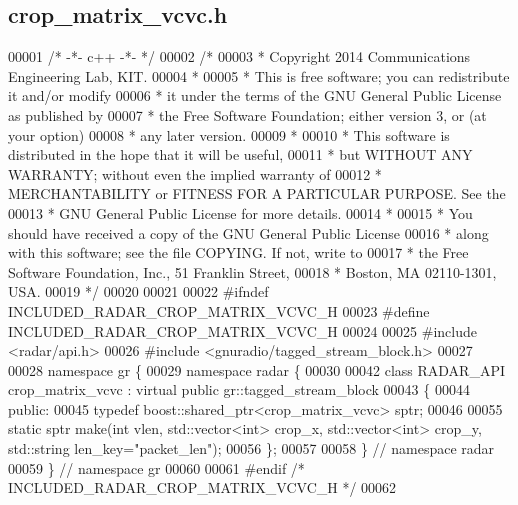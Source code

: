 \subsection{crop\+\_\+matrix\+\_\+vcvc.\+h}
\label{crop__matrix__vcvc_8h_source}

\begin{DoxyCode}
00001 \textcolor{comment}{/* -*- c++ -*- */}
00002 \textcolor{comment}{/* }
00003 \textcolor{comment}{ * Copyright 2014 Communications Engineering Lab, KIT.}
00004 \textcolor{comment}{ * }
00005 \textcolor{comment}{ * This is free software; you can redistribute it and/or modify}
00006 \textcolor{comment}{ * it under the terms of the GNU General Public License as published by}
00007 \textcolor{comment}{ * the Free Software Foundation; either version 3, or (at your option)}
00008 \textcolor{comment}{ * any later version.}
00009 \textcolor{comment}{ * }
00010 \textcolor{comment}{ * This software is distributed in the hope that it will be useful,}
00011 \textcolor{comment}{ * but WITHOUT ANY WARRANTY; without even the implied warranty of}
00012 \textcolor{comment}{ * MERCHANTABILITY or FITNESS FOR A PARTICULAR PURPOSE.  See the}
00013 \textcolor{comment}{ * GNU General Public License for more details.}
00014 \textcolor{comment}{ * }
00015 \textcolor{comment}{ * You should have received a copy of the GNU General Public License}
00016 \textcolor{comment}{ * along with this software; see the file COPYING.  If not, write to}
00017 \textcolor{comment}{ * the Free Software Foundation, Inc., 51 Franklin Street,}
00018 \textcolor{comment}{ * Boston, MA 02110-1301, USA.}
00019 \textcolor{comment}{ */}
00020 
00021 
00022 \textcolor{preprocessor}{#ifndef INCLUDED\_RADAR\_CROP\_MATRIX\_VCVC\_H}
00023 \textcolor{preprocessor}{#define INCLUDED\_RADAR\_CROP\_MATRIX\_VCVC\_H}
00024 
00025 \textcolor{preprocessor}{#include <radar/api.h>}
00026 \textcolor{preprocessor}{#include <gnuradio/tagged\_stream\_block.h>}
00027 
00028 \textcolor{keyword}{namespace }gr \{
00029   \textcolor{keyword}{namespace }radar \{
00030 
00042     \textcolor{keyword}{class }RADAR_API crop_matrix_vcvc : \textcolor{keyword}{virtual} \textcolor{keyword}{public} gr::tagged\_stream\_block
00043     \{
00044      \textcolor{keyword}{public}:
00045       \textcolor{keyword}{typedef} boost::shared\_ptr<crop\_matrix\_vcvc> sptr;
00046 
00055       \textcolor{keyword}{static} sptr make(\textcolor{keywordtype}{int} vlen, std::vector<int> crop\_x, std::vector<int> crop\_y, 
      std::string len\_key=\textcolor{stringliteral}{"packet\_len"});
00056     \};
00057 
00058   \} \textcolor{comment}{// namespace radar}
00059 \} \textcolor{comment}{// namespace gr}
00060 
00061 \textcolor{preprocessor}{#endif }\textcolor{comment}{/* INCLUDED\_RADAR\_CROP\_MATRIX\_VCVC\_H */}\textcolor{preprocessor}{}
00062 
\end{DoxyCode}
